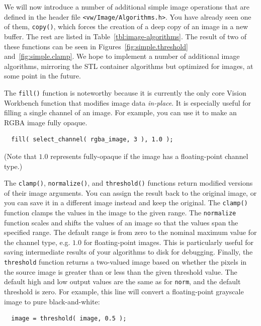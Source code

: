We will now introduce a number of additional simple image operations
that are defined in the header file \verb#<vw/Image/Algorithms.h>#.
You have already seen one of them, \verb#copy()#, which forces the
creation of a deep copy of an image in a new buffer.  The rest are
listed in Table~\ref{tbl:image-algorithms}.  The result of two of
these functions can be seen in Figures~\ref{fig:simple.threshold}
and~\ref{fig:simple.clamp}.  We hope to implement a number of
additional image algorithms, mirroring the STL container algorithms
but optimized for images, at some point in the future.

The \verb#fill()# function is noteworthy because it is currently the
only core Vision Workbench function that modifies image data {\it
  in-place}.  It is especially useful for filling a single channel of
an image.  For example, you can use it to make an RGBA image fully
opaque.
\begin{verbatim}
  fill( select_channel( rgba_image, 3 ), 1.0 );
\end{verbatim}
(Note that $1.0$ represents fully-opaque if the image has a 
floating-point channel type.)

The \verb#clamp()#, \verb#normalize()#, and \verb#threshold()#
functions return modified versions of their image arguments.
You can assign the result back to the original image, or you can 
save it in a different image instead and keep the original.  
The \verb#clamp()# function clamps the values in the image to 
the given range.  The \verb#normalize# function scales and 
shifts the values of an image so that the values span the 
specified range.  The default range is from zero to the nominal 
maximum value for the channel type, e.g. $1.0$ for floating-point 
images.  This is particularly useful for saving intermediate 
results of your algorithms to disk for debugging.  Finally, the 
\verb#threshold# function returns a two-valued image based on  
whether the pixels in the source image is greater than or less 
than the given threshold value.  The default high and low output 
values are the same as for \verb#norm#, and the default threshold 
is zero.  For example, this line will convert a floating-point 
grayscale image to pure black-and-white:
\begin{verbatim}
  image = threshold( image, 0.5 );
\end{verbatim}

